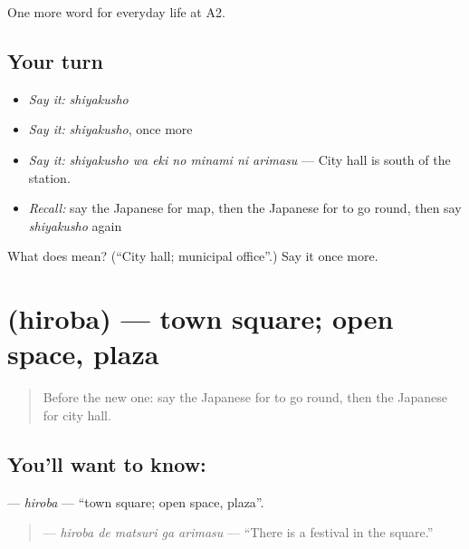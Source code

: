 \begin{grammarlens}[title={What you've built}]
One more word for everyday life at A2.
\end{grammarlens}

\subsection*{Your turn}
\begin{itemize}
\raggedright
  \item \emph{Say it:} \emph{shiyakusho}
  \item \emph{Say it:} \emph{shiyakusho}, once more
  \item \emph{Say it:} \emph{shiyakusho wa eki no minami ni arimasu} — City hall is south of the station.
  \item \emph{Recall:} say the Japanese for map, then the Japanese for to go round, then say \emph{shiyakusho} again
\end{itemize}

\begin{tcolorbox}[breakable,colback=teal!4,colframe=teal!35!black,title={Before you move on}]
What does  mean? (\textquotedblleft{}City hall; municipal office\textquotedblright{}.) Say it once more.
\end{tcolorbox}
\section[\texorpdfstring{\ja{ひろば} (hiroba)}{ひろば (hiroba)}]{ (hiroba) — town square; open space, plaza}

\label{lesson:JA-C197-hiroba}



\begin{quote}
Before the new one: say the Japanese for to go round, then the Japanese for city hall.
\end{quote}

\subsection*{You'll want to know: }
\textbf{} — \emph{hiroba} — \textquotedblleft{}town square; open space, plaza\textquotedblright{}.

\begin{quote}
\textbf{  } — \emph{hiroba de matsuri ga arimasu} — \textquotedblleft{}There is a festival in the square.\textquotedblright{}
\end{quote}

